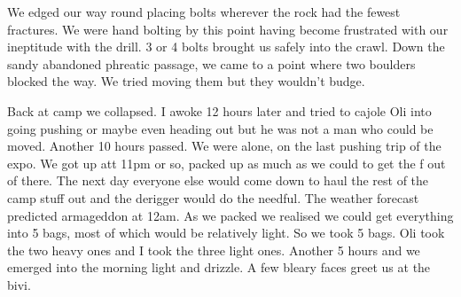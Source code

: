 We edged our way round placing bolts wherever the rock had the fewest fractures. We were hand bolting by this point having become frustrated with our ineptitude with the drill. 3 or 4 bolts brought us safely into the crawl. Down the sandy abandoned phreatic passage, we came to a point where two boulders blocked the way. We tried moving them but they wouldn't budge. 

 
Back at camp we collapsed. I awoke 12 hours later and tried to cajole Oli into going pushing or maybe even heading out but he was not a man who could be moved. Another 10 hours passed.  We were alone, on the last pushing trip of the expo. We got up att 11pm or so, packed up as much as we could to get the f out of there. The next day everyone else would come down to haul the rest of the camp stuff out and the derigger would do the needful. The weather forecast predicted armageddon at 12am. As we packed we realised we could get everything into 5 bags, most of which would be relatively light. So we took 5 bags. Oli took the two heavy ones and I took the three light ones. Another 5 hours and we emerged into the morning light and drizzle. A few bleary faces greet us at the bivi.


